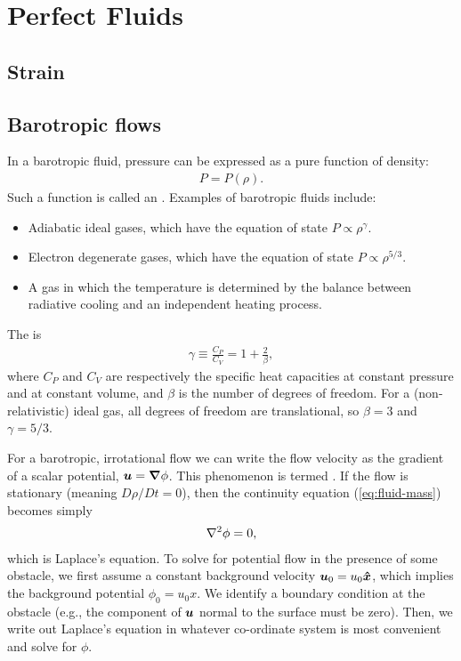 \section{Perfect Fluids}
\subsection{Strain}

\subsection{Barotropic flows}
In a barotropic fluid, pressure can be expressed as a pure function of density:
\begin{align}
    P = P(\rho).
\end{align}
Such a function is called an . Examples of barotropic fluids include:
\begin{itemize}
    \item Adiabatic ideal gases, which have the equation of state $P \propto \rho^\gamma$.
    \item Electron degenerate gases, which have the equation of state $P \propto \rho^{5/3}$.
    \item A gas in which the temperature is determined by the balance between radiative cooling and an independent heating process.
\end{itemize}
The  is
\begin{align}
    \gamma \equiv \frac{C_P}{C_V} = 1 + \frac{2}{\beta},
\end{align}
where $C_P$ and $C_V$ are respectively the specific heat capacities at constant pressure and at constant volume, and $\beta$ is the number of degrees of freedom. For a (non-relativistic) ideal gas, all degrees of freedom are translational, so $\beta = 3$ and $\gamma = 5/3$.

For a barotropic, irrotational flow we can write the flow velocity as the gradient of a scalar potential, $\vb*{u} = \grad{\phi}$. This phenomenon is termed . If the flow is stationary (meaning $D\rho/Dt = 0$), then the continuity equation (\ref{eq:fluid-mass}) becomes simply
\begin{align}
    \laplacian{\phi} = 0,
\end{align}
which is Laplace's equation. To solve for potential flow in the presence of some obstacle, we first assume a constant background velocity $\vb*{u}_0 = u_0 \vu*{x}$, which implies the background potential $\phi_0 = u_0 x$. We identify a boundary condition at the obstacle (e.g., the component of $\vb*{u}$ normal to the surface must be zero). Then, we write out Laplace's equation in whatever co-ordinate system is most convenient and solve for $\phi$.

